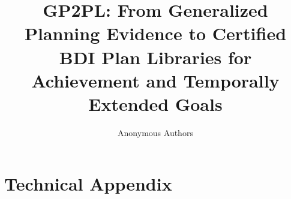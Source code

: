\documentclass[sigconf,anonymous]{aamas}
\title{GP2PL: From Generalized Planning Evidence to Certified BDI Plan
Libraries for Achievement and Temporally Extended Goals}
\author{Anonymous Authors}
\affiliation{
	\institution{Anonymous Institution}
	\city{Anonymous City}
	\country{Anonymous Country}}
\begin{document}
\maketitle












\clearpage
\appendix
\renewcommand{\thefigure}{S\arabic{figure}}
\renewcommand{\thetable}{S\arabic{table}}
\renewcommand{\thealgorithm}{S\arabic{algorithm}}
\setcounter{figure}{0}
\setcounter{table}{0}
\setcounter{algorithm}{0}
\section*{Technical Appendix}

\end{document}
